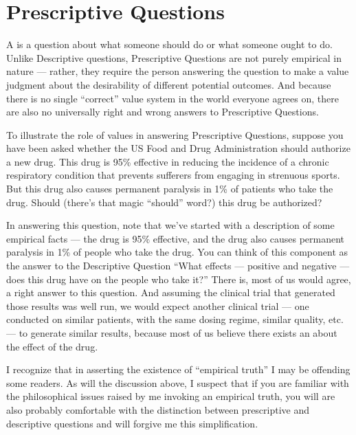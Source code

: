 \documentclass[letterpaper,10pt,english]{jupyterBook}
\begin{document}
\section{Prescriptive Questions}
\label{\detokenize{30_questions/05_descriptive_v_prescriptive:prescriptive-questions}}
\sphinxAtStartPar
A  is a question about what someone should do or what someone ought to do. Unlike Descriptive questions, Prescriptive Questions are not purely empirical in nature — rather, they require the person answering the question to make a value judgment about the desirability of different potential outcomes. And because there is no single “correct” value system in the world everyone agrees on, there are also no universally right and wrong answers to Prescriptive Questions.

\sphinxAtStartPar
To illustrate the role of values in answering Prescriptive Questions, suppose you have been asked whether the US Food and Drug Administration should authorize a new drug. This drug is 95\% effective in reducing the incidence of a chronic respiratory condition that prevents sufferers from engaging in strenuous sports. But this drug also causes permanent paralysis in 1\% of patients who take the drug. Should (there’s that magic “should” word?) this drug be authorized?

\sphinxAtStartPar
In answering this question, note that we’ve started with a description of some empirical facts — the drug is 95\% effective, and the drug also causes permanent paralysis in 1\% of people who take the drug. You can think of this component as the answer to the Descriptive Question “What effects — positive and negative — does this drug have on the people who take it?” There is, most of us would agree, a right answer to this question. And assuming the clinical trial that generated those results was well run, we would expect another clinical trial — one conducted on similar patients, with the same dosing regime, similar quality, etc. — to generate similar results, because most of us believe there exists an  about the effect of the drug.%
\begin{footnote}[2]\sphinxAtStartFootnote
I recognize that in asserting the existence of “empirical truth” I may be offending some readers. As will the discussion above, I suspect that if you are familiar with the philosophical issues raised by me invoking an empirical truth, you will are also probably comfortable with the distinction between prescriptive and descriptive questions and will forgive me this simplification.
%
\end{footnote}
\end{document}
